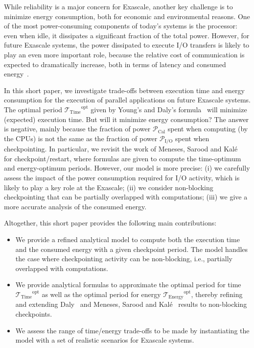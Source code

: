 \documentclass[a4paper]{article}
\newcommand{\ema}[1]{\ensuremath{#1}\xspace}
\renewcommand{\time}[1][]{\ema{\mathcal{T}_{\text{#1}}}}
\newcommand{\toptT}{\ema{\time[Time]^{\text{opt}}}}
\newcommand{\toptE}{\ema{\time[Energy]^{\text{opt}}}}
\newcommand{\power}[1][]{\ema{\mathcal{P}_{\text{#1}}}}
\newcommand{\pCal}{\power[Cal]}
\newcommand{\pIO}{\power[I/O]}
\begin{document}
While reliability is a major concern for Exascale, another key challenge is to minimize 
energy consumption, both for economic and environmental reasons. 
One of the most power-consuming components of today's systems is the processor: 
even when idle, it dissipates a significant fraction of the total power. However, for future
Exascale systems, the power dissipated to execute I/O transfers
is likely to play an even more important role, because the relative cost of communication is
expected to dramatically increase, both in terms of latency and consumed energy~\cite{Shalf2011}. 

In this short paper, we investigate trade-offs between execution time and energy consumption
for the execution of parallel applications on future Exascale systems. 
The optimal period $\toptT$ given by Young's and Daly's formula~\cite{young74,daly04} 
will minimize (expected) execution time. But will it minimize energy consumption?
The answer is negative, mainly because the fraction of power \pCal spent when computing (by the CPUs) is not 
the same as the fraction of power \pIO spent when checkpointing. 
In particular, we revisit the work of Meneses, Sarood and Kalé~\cite{Kale2012} for checkpoint/restart, where formulas 
are given to compute the time-optimum and energy-optimum periods. 
However, our model is more precise: (i) we carefully assess  the impact of the
power consumption required for I/O activity, which is likely to play a key role
at the Exascale; (ii) we consider non-blocking checkpointing that can be partially
overlapped with computations; (iii) we give a more accurate analysis of the consumed energy.

Altogether, this short paper provides the following main contributions:
\begin{itemize}
\item We provide a refined analytical model to compute both the execution time and the
consumed energy with a given checkpoint 
period. The model handles the case where checkpointing activity can be non-blocking, i.e.,  
partially overlapped with computations. 
\item We provide analytical formulas to approximate the optimal period for time $\toptT$
 as well as the optimal period  for energy $\toptE$,  thereby refining and extending
Daly~\cite{daly04} and Meneses, Sarood and Kalé~\cite{Kale2012} results to
non-blocking checkpoints.
\item We assess the range of time/energy trade-offs to be made by instantiating the model 
with a set of realistic scenarios for Exascale systems. 
\end{itemize}
\end{document}
